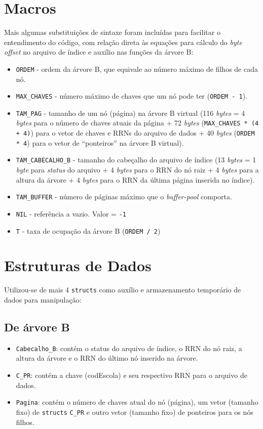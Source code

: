\documentclass[
	12pt,				%
	openany,			%
	twoside,			%
	a4paper,			%
	english,			%
	french,				%
	spanish,			%
	brazil,				%
	]{abntex2}
\begin{document}
\section{Macros}
    Mais algumas substituições de sintaxe foram incluídas para facilitar o entendimento do código, com relação direta às equações para cálculo do \textit{byte offset} no arquivo de índice e auxílio nas funções da árvore B:
    \begin{itemize}
    \item \verb|ORDEM| - ordem da árvore B, que equivale ao número máximo de filhos de cada nó.
    \item \verb|MAX_CHAVES| - número máximo de chaves que um nó pode ter (\verb|ORDEM - 1|).
    \item \verb|TAM_PAG| - tamanho de um nó (página) na árvore B virtual (116 \textit{bytes} = 4 \textit{bytes} para o número de chaves atuais da página + 72 \textit{bytes} (\verb|MAX_CHAVES * (4 + 4)|) para o vetor de chaves e RRNs do arquivo de dados + 40 \textit{bytes} (\verb|ORDEM * 4|) para o vetor de “ponteiros” na árvore B virtual).
    \item \verb|TAM_CABECALHO_B| - tamanho do cabeçalho do arquivo de índice (13 \textit{bytes} = 1 \textit{byte} para \textit{status} do arquivo + 4 \textit{bytes} para o RRN do nó raiz + 4 \textit{bytes} para a altura da árvore + 4 \textit{bytes} para o RRN da última página inserida no índice).
    \item \verb|TAM_BUFFER| - número de páginas máximo que o \textit{buffer-pool} comporta.
    \item \verb|NIL| - referência a vazio. Valor = \verb|-1|
    \item \verb|T| - taxa de ocupação da árvore B (\verb|ORDEM / 2|)
    \end{itemize}

\section{Estruturas de Dados}
    Utilizou-se de mais 4 \verb|structs| como auxílio e armazenamento temporário de dados para manipulação:
    \subsection{De árvore B}
        \begin{itemize}
            \item \verb|Cabecalho_B|: contém o status do arquivo de índice, o RRN do nó raiz, a altura da árvore e o RRN do último nó inserido na árvore.
            \item \verb|C_PR|: contém a chave (codEscola) e seu respectivo RRN para o arquivo de dados.
            \item \verb|Pagina|: contém o número de chaves atual do nó (página), um vetor (tamanho fixo) de \verb|structs| \verb|C_PR| e outro vetor (tamanho fixo) de ponteiros para os nós filhos.
        \end{itemize}
\end{document}
